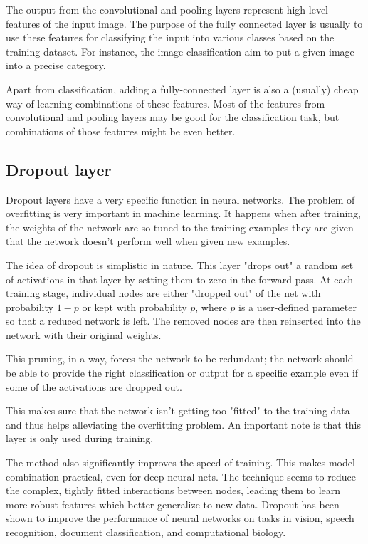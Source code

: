 The output from the convolutional and pooling layers represent high-level features of the input image. The purpose of the fully connected layer is usually to use these features for classifying the input into various classes based on the training dataset. For instance, the image classification aim to put a given image into a precise category.

Apart from classification, adding a fully-connected layer is also a (usually) cheap way of learning combinations of these features. Most of the features from convolutional and pooling layers may be good for the classification task, but combinations of those features might be even better.

\subsection{Dropout layer}

Dropout layers have a very specific function in neural networks. The problem of overfitting is very important in machine learning. It happens when after training, the weights of the network are so tuned to the training examples they are given that the network doesn't perform well when given new examples.

The idea of dropout is simplistic in nature. This layer "drops out" a random set of activations in that layer by setting them to zero in the forward pass. At each training stage, individual nodes are either "dropped out" of the net with probability $1-p$ or kept with probability $p$, where $p$ is a user-defined parameter so that a reduced network is left. The removed nodes are then reinserted into the network with their original weights.

This pruning, in a way, forces the network to be redundant; the network should be able to provide the right classification or output for a specific example even if some of the activations are dropped out.

This makes sure that the network isn’t getting too "fitted" to the training data and thus helps alleviating the overfitting problem. An important note is that this layer is only used during training.

The method also significantly improves the speed of training. This makes model combination practical, even for deep neural nets. The technique seems to reduce the complex, tightly fitted interactions between nodes, leading them to learn more robust features which better generalize to new data. Dropout has been shown to improve the performance of neural networks on tasks in vision, speech recognition, document classification, and computational biology.

